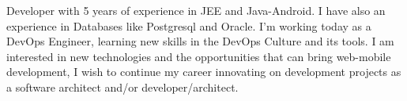 %
%
%
\par{
Developer with 5 years of experience in JEE and Java-Android. I have also an experience in Databases like Postgresql and
Oracle. I'm working today as a DevOps Engineer, learning new skills in the DevOps Culture and its tools. I am interested
in new technologies and the opportunities that can bring web-mobile development, I wish to continue my career innovating
on development projects as a software architect and/or developer/architect.
}
